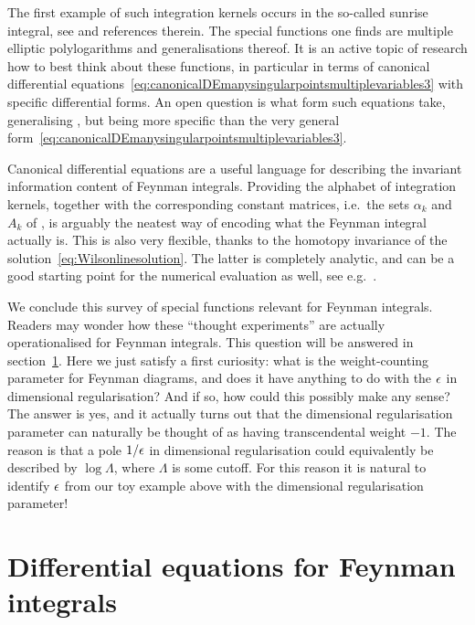 The first example of such integration kernels occurs in the so-called sunrise integral, see \cite{ch4Bourjaily:2022bwx} and references therein.
The special functions one finds are multiple elliptic polylogarithms and generalisations thereof.
It is an active topic of research how to best think about these functions,
in particular in terms of canonical differential equations~\eqref{eq:canonicalDEmanysingularpointsmultiplevariables3} with specific differential forms.
An open question is what form such equations take, generalising ,
but being more specific than the very general form~\eqref{eq:canonicalDEmanysingularpointsmultiplevariables3}.

\begin{important}{Canonical differential equations are a useful language for describing the invariant information content of Feynman integrals.}
Providing the alphabet of integration kernels, together with the corresponding constant matrices, i.e.\ the sets $\alpha_k$ and $A_k$ of , is arguably the neatest way of encoding what the Feynman integral actually is. This is also very flexible, thanks to the homotopy invariance of the solution~\eqref{eq:Wilsonlinesolution}. The latter is completely analytic, and can be a good starting point for the numerical evaluation as well, see e.g.~\cite{ch4Chicherin:2021dyp}.
\end{important}

 
We conclude this survey of special functions relevant for Feynman integrals. Readers may wonder how these ``thought experiments'' are actually operationalised for Feynman integrals. This question will be answered in section~\ref{sec:DEFeynmanintegrals}. Here we just satisfy a first curiosity: what is the weight-counting parameter for Feynman diagrams, and does it have anything to do with the $\epsilon$ in dimensional regularisation? And if so, how could this possibly make any sense? The answer is yes, and it actually turns out that the dimensional regularisation parameter can naturally be thought of as having transcendental weight $-1$. The reason is that a pole $1/\epsilon$ in dimensional regularisation could equivalently be described by $\log \Lambda$, where $\Lambda$ is some cutoff. For this reason it is natural to identify $\epsilon$ from our toy example above with the dimensional regularisation parameter!




\section{Differential equations for Feynman integrals}
\label{sec:DEFeynmanintegrals}

